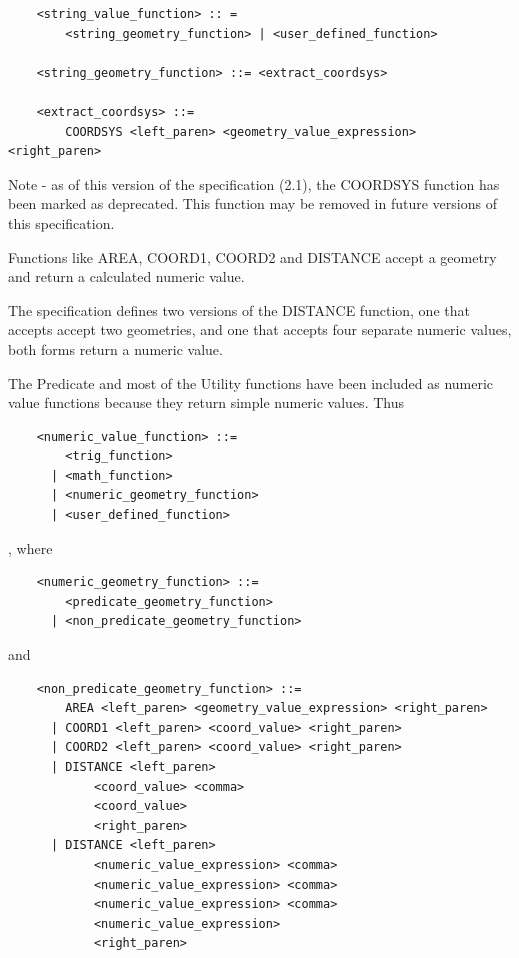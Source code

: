 \documentclass[11pt,a4paper]{ivoa}
\begin{document}
\begin{verbatim}
    <string_value_function> :: =
        <string_geometry_function> | <user_defined_function>

    <string_geometry_function> ::= <extract_coordsys>

    <extract_coordsys> ::=
        COORDSYS <left_paren> <geometry_value_expression> <right_paren>
\end{verbatim}

Note - as of this version of the specification (2.1), the COORDSYS function has
been marked as deprecated. This function may be removed in future versions
of this specification.

Functions like AREA, COORD1, COORD2 and DISTANCE accept a geometry and
return a calculated numeric value.

The specification defines two versions of the DISTANCE function,
one that accepts accept two geometries, and one that accepts four
separate numeric values, both forms return a numeric value.

The Predicate and most of the Utility functions have been included as numeric
value functions because they return simple numeric values. Thus

\begin{verbatim}
    <numeric_value_function> ::=
        <trig_function>
      | <math_function>
      | <numeric_geometry_function>
      | <user_defined_function>
\end{verbatim}

, where

\begin{verbatim}
    <numeric_geometry_function> ::=
        <predicate_geometry_function>
      | <non_predicate_geometry_function>
\end{verbatim}

and

\begin{verbatim}
    <non_predicate_geometry_function> ::=
        AREA <left_paren> <geometry_value_expression> <right_paren>
      | COORD1 <left_paren> <coord_value> <right_paren>
      | COORD2 <left_paren> <coord_value> <right_paren>
      | DISTANCE <left_paren>
            <coord_value> <comma>
            <coord_value>
            <right_paren>
      | DISTANCE <left_paren>
            <numeric_value_expression> <comma>
            <numeric_value_expression> <comma>
            <numeric_value_expression> <comma>
            <numeric_value_expression>
            <right_paren>
\end{verbatim}
\end{document}
